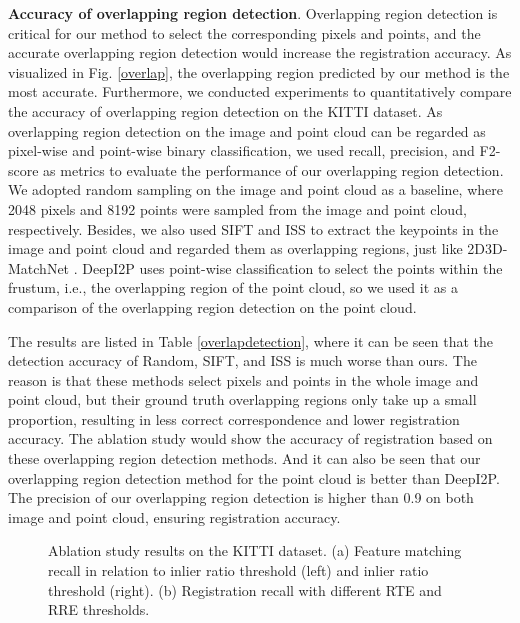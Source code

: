 \documentclass[lettersize,journal]{IEEEtran}
\begin{document}
\noindent\textbf{Accuracy of overlapping region detection}. Overlapping region detection is critical for our method to select the corresponding pixels and points, and the accurate overlapping region detection would increase the registration accuracy.
As visualized in Fig. \ref{overlap}, the overlapping region predicted by our method is the most accurate. Furthermore, we conducted experiments to quantitatively compare the accuracy of overlapping region detection on the KITTI dataset. As overlapping region detection on the image and point cloud can be regarded as pixel-wise and point-wise binary classification,
we used recall, precision, and F2-score as metrics to evaluate the performance of our overlapping region detection. We adopted random sampling on the image and point cloud as a baseline,
where 2048 pixels and 8192 points were sampled from the image and point cloud, respectively. Besides, we also used SIFT \cite{SIFT} and ISS \cite{ISS} to extract the keypoints in the image and point cloud and regarded them as overlapping regions, just like 2D3D-MatchNet \cite{2D3DMATCHNET}. DeepI2P uses  point-wise classification to select the points within the frustum, i.e., the overlapping region of the point cloud, so we used it as a comparison of the overlapping region detection on the point cloud.

The results are listed in Table \ref{overlapdetection}, where it can be seen that the detection accuracy of Random, SIFT, and ISS is much worse than ours. The reason is that these methods select pixels and points in the whole image and point cloud, but their ground truth overlapping regions only take up a small proportion, resulting in less correct correspondence and lower registration accuracy. The ablation study would show the accuracy of registration based on these overlapping region detection methods. And it can also be seen that our overlapping region detection method for the point cloud is better than DeepI2P. The precision of our overlapping region detection is higher than 0.9 on both image and point cloud, ensuring registration accuracy. \\

\begin{figure*}[h]
\centering
{}
\caption{Ablation study results on the KITTI dataset. (a) Feature matching recall in relation to inlier ratio threshold (left) and inlier ratio threshold (right). (b) Registration recall with different RTE and RRE thresholds.}
\label{FIG7}
\end{figure*}
\end{document}
